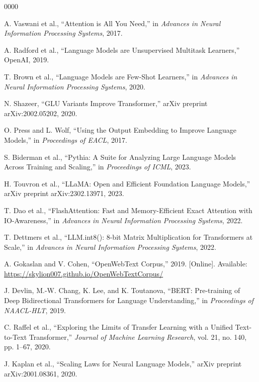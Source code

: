 \documentclass[conference]{IEEEtran}
\begin{document}
\begin{thebibliography}{00}{00}

A. Vaswani et al., ``Attention is All You Need,'' in \textit{Advances in Neural Information Processing Systems}, 2017.

A. Radford et al., ``Language Models are Unsupervised Multitask Learners,'' OpenAI, 2019.

T. Brown et al., ``Language Models are Few-Shot Learners,'' in \textit{Advances in Neural Information Processing Systems}, 2020.

N. Shazeer, ``GLU Variants Improve Transformer,'' arXiv preprint arXiv:2002.05202, 2020.

O. Press and L. Wolf, ``Using the Output Embedding to Improve Language Models,'' in \textit{Proceedings of EACL}, 2017.

S. Biderman et al., ``Pythia: A Suite for Analyzing Large Language Models Across Training and Scaling,'' in \textit{Proceedings of ICML}, 2023.

H. Touvron et al., ``LLaMA: Open and Efficient Foundation Language Models,'' arXiv preprint arXiv:2302.13971, 2023.

T. Dao et al., ``FlashAttention: Fast and Memory-Efficient Exact Attention with IO-Awareness,'' in \textit{Advances in Neural Information Processing Systems}, 2022.

T. Dettmers et al., ``LLM.int8(): 8-bit Matrix Multiplication for Transformers at Scale,'' in \textit{Advances in Neural Information Processing Systems}, 2022.

A. Gokaslan and V. Cohen, ``OpenWebText Corpus,'' 2019. [Online]. Available: \url{https://skylion007.github.io/OpenWebTextCorpus/}

J. Devlin, M.-W. Chang, K. Lee, and K. Toutanova, ``BERT: Pre-training of Deep Bidirectional Transformers for Language Understanding,'' in \textit{Proceedings of NAACL-HLT}, 2019.

C. Raffel et al., ``Exploring the Limits of Transfer Learning with a Unified Text-to-Text Transformer,'' \textit{Journal of Machine Learning Research}, vol. 21, no. 140, pp. 1--67, 2020.

J. Kaplan et al., ``Scaling Laws for Neural Language Models,'' arXiv preprint arXiv:2001.08361, 2020.


\end{thebibliography}
\end{document}
